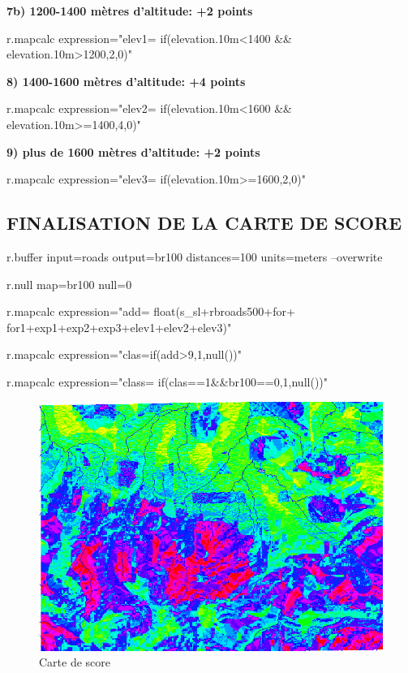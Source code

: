 \noindent \textbf{
7b) 1200-1400 m\`etres d'altitude: +2 points}
\begin{smallverbatim}
r.mapcalc expression="elev1=
if(elevation.10m<1400 && elevation.10m>1200,2,0)"
\end{smallverbatim}

\noindent \textbf{
8) 1400-1600 m\`etres d'altitude: +4 points}
\begin{smallverbatim}
r.mapcalc expression="elev2=
if(elevation.10m<1600 && elevation.10m>=1400,4,0)"
\end{smallverbatim}

\noindent \textbf{
9) plus de 1600 m\`etres d'altitude: +2 points}
\begin{smallverbatim}
r.mapcalc expression="elev3=
if(elevation.10m>=1600,2,0)"
\end{smallverbatim}

\subsection{FINALISATION DE LA CARTE DE SCORE}

\begin{smallverbatim}
r.buffer input=roads output=br100
 distances=100 units=meters --overwrite

r.null map=br100 null=0

r.mapcalc expression="add=
float(s_sl+rbroads500+for+
 for1+exp1+exp2+exp3+elev1+elev2+elev3)"

r.mapcalc expression="clas=if(add>9,1,null())"

r.mapcalc expression="class=
if(clas==1&&br100==0,1,null())"
\end{smallverbatim}

\begin{figure}[htbp]
   \centering
   \includegraphics[scale=0.35]{grass021.png}
   \caption{Carte de score}
   \label{fig:grass021}
\end{figure}

